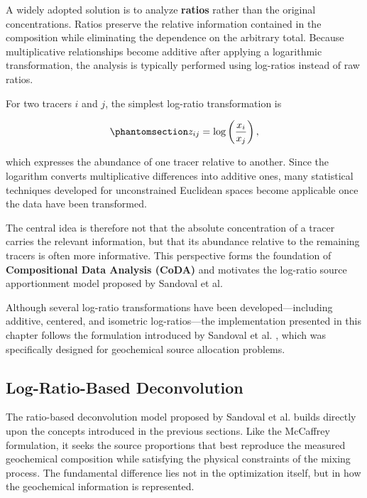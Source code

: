\documentclass[
  12pt,
  letterpaper,
]{book}
\begin{document}
A widely adopted solution is to analyze \textbf{ratios} rather than the
original concentrations. Ratios preserve the relative information
contained in the composition while eliminating the dependence on the
arbitrary total. Because multiplicative relationships become additive
after applying a logarithmic transformation, the analysis is typically
performed using log-ratios instead of raw ratios.

For two tracers \(i\) and \(j\), the simplest log-ratio transformation
is

\begin{equation}\phantomsection\label{eq-log-ratio}{
z_{ij}
=
\log\left(
\frac{x_i}{x_j}
\right),
}\end{equation}

which expresses the abundance of one tracer relative to another. Since
the logarithm converts multiplicative differences into additive ones,
many statistical techniques developed for unconstrained Euclidean spaces
become applicable once the data have been transformed.

The central idea is therefore not that the absolute concentration of a
tracer carries the relevant information, but that its abundance relative
to the remaining tracers is often more informative. This perspective
forms the foundation of \textbf{Compositional Data Analysis (CoDA)} and
motivates the log-ratio source apportionment model proposed by Sandoval
et al.

Although several log-ratio transformations have been
developed---including additive, centered, and isometric log-ratios---the
implementation presented in this chapter follows the formulation
introduced by Sandoval et al.
, which was specifically
designed for geochemical source allocation problems.

\subsection{Log-Ratio-Based
Deconvolution}\label{log-ratio-based-deconvolution}

The ratio-based deconvolution model proposed by Sandoval et al.
 builds directly upon the
concepts introduced in the previous sections. Like the McCaffrey
formulation, it seeks the source proportions that best reproduce the
measured geochemical composition while satisfying the physical
constraints of the mixing process. The fundamental difference lies not
in the optimization itself, but in how the geochemical information is
represented.
\end{document}
